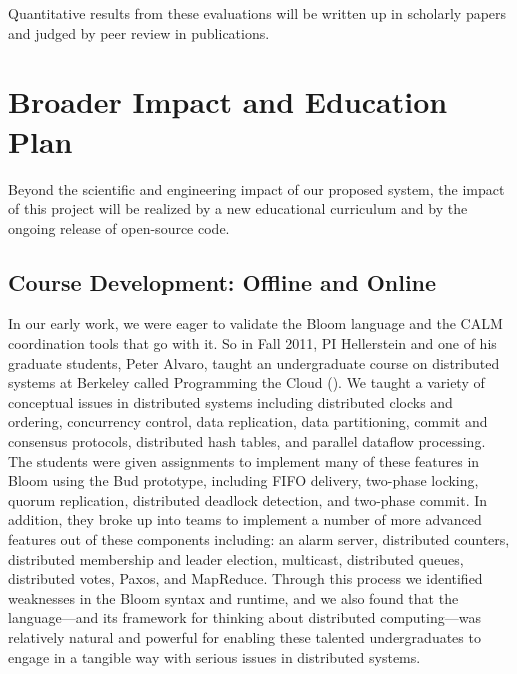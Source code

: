 Quantitative results from these evaluations will be written up in scholarly papers and judged by peer review in publications.

\section{Broader Impact and Education Plan}

Beyond the scientific and engineering impact of our proposed system,
the impact of this project will be realized by a new educational
curriculum and by the ongoing release of open-source code.  


\subsection{Course Development: Offline and Online}

In our early work, we were eager to validate the Bloom language and the CALM coordination tools that go with it.  So in Fall 2011, PI Hellerstein and one of his graduate students, Peter Alvaro, taught an undergraduate course on distributed systems at Berkeley called Programming the Cloud ().  We taught a variety of conceptual issues in distributed systems including distributed clocks and ordering, concurrency control, data replication, data partitioning, commit and consensus protocols, distributed hash tables, and parallel dataflow processing.  The students were given assignments to implement many of these features in Bloom using the Bud prototype, including FIFO delivery, two-phase locking, quorum replication,  distributed deadlock detection, and two-phase commit.  In addition, they broke up into teams to implement a number of more advanced features out of these components including: an alarm server, distributed counters, distributed membership and leader election, multicast, distributed queues, distributed votes, Paxos, and MapReduce.  Through this process we identified weaknesses in the Bloom syntax and runtime, and we also found that the language---and its framework for thinking about distributed computing---was relatively natural and powerful for enabling these talented undergraduates to engage in a tangible way with serious issues in distributed systems.

